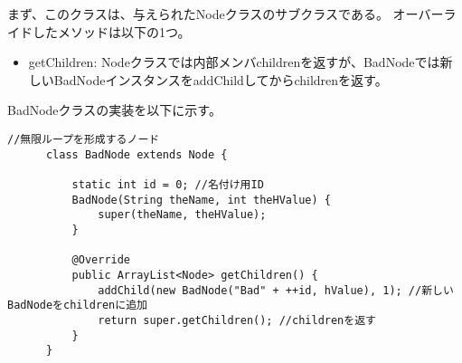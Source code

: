 \documentclass{jarticle}
\begin{document}
まず、このクラスは、与えられたNodeクラスのサブクラスである。
オーバーライドしたメソッドは以下の1つ。
\begin{itemize}
  \item getChildren: Nodeクラスでは内部メンバchildrenを返すが、BadNodeでは新しいBadNodeインスタンスをaddChildしてからchildrenを返す。

\end{itemize}

BadNodeクラスの実装を以下に示す。
\begin{lstlisting}[caption=BadNodeクラス,label=src:BadNode]
      //無限ループを形成するノード
      class BadNode extends Node {
  
          static int id = 0; //名付け用ID
          BadNode(String theName, int theHValue) {
              super(theName, theHValue);
          }
  
          @Override
          public ArrayList<Node> getChildren() {
              addChild(new BadNode("Bad" + ++id, hValue), 1); //新しいBadNodeをchildrenに追加
              return super.getChildren(); //childrenを返す
          }
      }
  \end{lstlisting}
\end{document}
